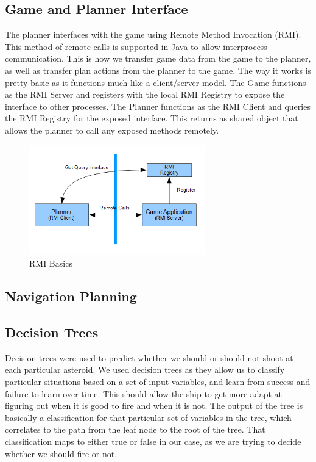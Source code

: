 \documentclass[10pt,draft,conference]{IEEEtran}
\begin{document}
\subsection{Game and Planner Interface}
The planner interfaces with the game using Remote Method Invocation (RMI).  This method of remote calls is supported in Java to allow interprocess communication.  This is how we transfer game data from the game to the planner, as well as transfer plan actions from the planner to the game.  The way it works is pretty basic as it functions much like a client/server model.  The Game functions as the RMI Server and registers with the local RMI Registry to expose the interface to other processes.  The Planner functions as the RMI Client and queries the RMI Registry for the exposed interface.  This returns as shared object that allows the planner to call any exposed methods remotely.

\begin{figure}
\centering
\includegraphics[width=3.0in]{RMI.png}
\caption{RMI Basics}
\label{fig_rmi}
\end{figure}

\subsection{Navigation Planning}


\subsection{Decision Trees}
Decision trees were used to predict whether we should or should not shoot at each particular asteroid.  We used decision trees as they allow us to classify particular situations based on a set of input variables, and learn from success and failure to learn over time.  This should allow the ship to get more adapt at figuring out when it is good to fire and when it is not.  The output of the tree is basically a classification for that particular set of variables in the tree, which correlates to the path from the leaf node to the root of the tree.  That classification maps to either true or false in our case, as we are trying to decide whether we should fire or not.
\end{document}
